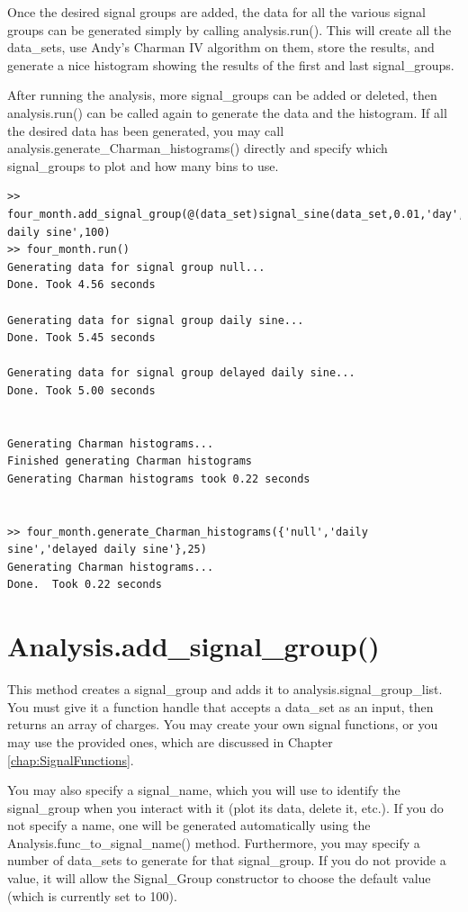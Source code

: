 \documentclass[12pt]{report}
\begin{document}
Once the desired signal groups are added, the data for all the various signal groups can be generated simply by calling analysis.run().  This will create all the data\_sets, use Andy's Charman IV algorithm on them, store the results, and generate a nice histogram showing the results of the first and last signal\_groups.

After running the analysis, more signal\_groups can be added or deleted, then analysis.run() can be called again to generate the data and the histogram.  If all the desired data has been generated, you may call analysis.generate\_Charman\_histograms() directly and specify which signal\_groups to plot and how many bins to use.

\begin{verbatim}
>> four_month.add_signal_group(@(data_set)signal_sine(data_set,0.01,'day',pi/8),'delayed daily sine',100)
>> four_month.run()
Generating data for signal group null...
Done. Took 4.56 seconds

Generating data for signal group daily sine...
Done. Took 5.45 seconds

Generating data for signal group delayed daily sine...
Done. Took 5.00 seconds


Generating Charman histograms...
Finished generating Charman histograms
Generating Charman histograms took 0.22 seconds


>> four_month.generate_Charman_histograms({'null','daily sine','delayed daily sine'},25)
Generating Charman histograms...
Done.  Took 0.22 seconds
\end{verbatim}

\section{Analysis.add\_signal\_group()}
This method creates a signal\_group and adds it to analysis.signal\_group\_list.  You must give it a function handle that accepts a data\_set as an input, then returns an array of charges.  You may create your own signal functions, or you may use the provided ones, which are discussed in Chapter \ref{chap:SignalFunctions}.

You may also specify a signal\_name, which you will use to identify the signal\_group when you interact with it (plot its data, delete it, etc.).  If you do not specify a name, one will be generated automatically using the Analysis.func\_to\_signal\_name() method.  Furthermore, you may specify a number of data\_sets to generate for that signal\_group.  If you do not provide a value, it will allow the Signal\_Group constructor to choose the default value (which is currently set to 100).
\end{document}
